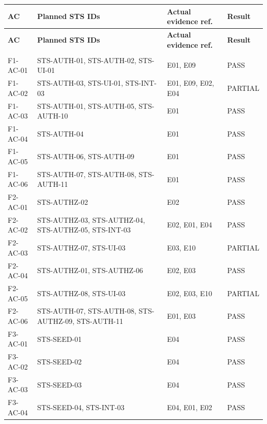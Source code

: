\begin{longtable}{@{}>{\raggedright\arraybackslash}p{}>{\raggedright\arraybackslash}p{}>{\raggedright\arraybackslash}p{}>{\raggedright\arraybackslash}p{}@{}}
\toprule
\textbf{AC} & \textbf{Planned STS IDs} & \textbf{Actual evidence ref.} & \textbf{Result} \\
\midrule
\endfirsthead
\toprule
\textbf{AC} & \textbf{Planned STS IDs} & \textbf{Actual evidence ref.} & \textbf{Result} \\
\midrule
\endhead
\midrule\multicolumn{4}{r}{\footnotesize Continued on next page} \\
\endfoot
\bottomrule
\endlastfoot
\mbox{F1-AC-01} & \mbox{STS-AUTH-01}, \mbox{STS-AUTH-02}, \mbox{STS-UI-01} & E01, E09 & PASS \\
\mbox{F1-AC-02} & \mbox{STS-AUTH-03}, \mbox{STS-UI-01}, \mbox{STS-INT-03} & E01, E09, E02, E04 & PARTIAL \\
\mbox{F1-AC-03} & \mbox{STS-AUTH-01}, \mbox{STS-AUTH-05}, \mbox{STS-AUTH-10} & E01 & PASS \\
\mbox{F1-AC-04} & \mbox{STS-AUTH-04} & E01 & PASS \\
\mbox{F1-AC-05} & \mbox{STS-AUTH-06}, \mbox{STS-AUTH-09} & E01 & PASS \\
\mbox{F1-AC-06} & \mbox{STS-AUTH-07}, \mbox{STS-AUTH-08}, \mbox{STS-AUTH-11} & E01 & PASS \\
\mbox{F2-AC-01} & \mbox{STS-AUTHZ-02} & E02 & PASS \\
\mbox{F2-AC-02} & \mbox{STS-AUTHZ-03}, \mbox{STS-AUTHZ-04}, \mbox{STS-AUTHZ-05}, \mbox{STS-INT-03} & E02, E01, E04 & PASS \\
\mbox{F2-AC-03} & \mbox{STS-AUTHZ-07}, \mbox{STS-UI-03} & E03, E10 & PARTIAL \\
\mbox{F2-AC-04} & \mbox{STS-AUTHZ-01}, \mbox{STS-AUTHZ-06} & E02, E03 & PASS \\
\mbox{F2-AC-05} & \mbox{STS-AUTHZ-08}, \mbox{STS-UI-03} & E02, E03, E10 & PARTIAL \\
\mbox{F2-AC-06} & \mbox{STS-AUTH-07}, \mbox{STS-AUTH-08}, \mbox{STS-AUTHZ-09}, \mbox{STS-AUTH-11} & E01, E03 & PASS \\
\mbox{F3-AC-01} & \mbox{STS-SEED-01} & E04 & PASS \\
\mbox{F3-AC-02} & \mbox{STS-SEED-02} & E04 & PASS \\
\mbox{F3-AC-03} & \mbox{STS-SEED-03} & E04 & PASS \\
\mbox{F3-AC-04} & \mbox{STS-SEED-04}, \mbox{STS-INT-03} & E04, E01, E02 & PASS \\

\end{longtable}
